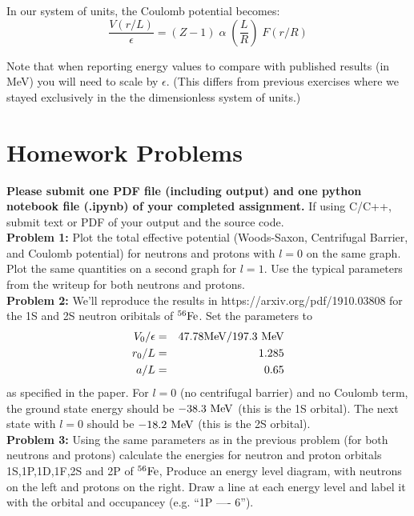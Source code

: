 \documentclass[12pt]{article}
\begin{document}
In our system of units, the Coulomb potential becomes:
$$\frac{V(r/L)}{\epsilon} = (Z-1) \; \alpha \; \left( \frac{L}{R} \right) \; F(r/R)$$

Note that when reporting energy values to compare with published results (in MeV) you will need to scale by $\epsilon$.  (This differs from previous exercises where we stayed exclusively in the the dimensionless system of units.)

\section{Homework Problems}

\noindent
{\bf Please submit one PDF file (including output) and one python
  notebook file (.ipynb) of your completed assignment.}  If using
C/C++, submit text or PDF of your output and the source code.\\[3pt]

\noindent
{\bf Problem 1:} Plot the total effective potential (Woods-Saxon, Centrifugal Barrier, and Coulomb potential) for neutrons and protons with $l=0$ on the same graph.  Plot the same quantities on a second graph for $l=1$.  Use the typical parameters from the writeup for both neutrons and protons.\\[5pt]


\noindent
{\bf Problem 2:} We'll reproduce the results in https://arxiv.org/pdf/1910.03808 for the 1S and 2S neutron oribitals of $^{56}\rm Fe$.  Set the parameters to
\begin{eqnarray*}
V_0/\epsilon &=& 47.78 {\rm MeV} / 197.3~{\rm MeV} \\
r_0/L &=& 1.285 \\
a/L   &=& 0.65 \\
\end{eqnarray*}
as specified in the paper.  For $l=0$ (no centrifugal barrier) and no
Coulomb term, the ground state energy should be $-38.3~\rm MeV$ (this
is the 1S orbital).  The next state with $l=0$ should be $-18.2~\rm
MeV$ (this is the 2S orbital).\\[5pt]

\noindent
{\bf Problem 3:} Using the same parameters as in the previous problem
(for both neutrons and protons) calculate the energies for neutron and
proton orbitals 1S,1P,1D,1F,2S and 2P of $^{56}\rm Fe$,
Produce an energy level diagram, with neutrons on the left and protons on the right.  Draw a line at each energy level and label it with the orbital and occupancey (e.g. ``1P ---- 6'').\\[5pt]
\end{document}
